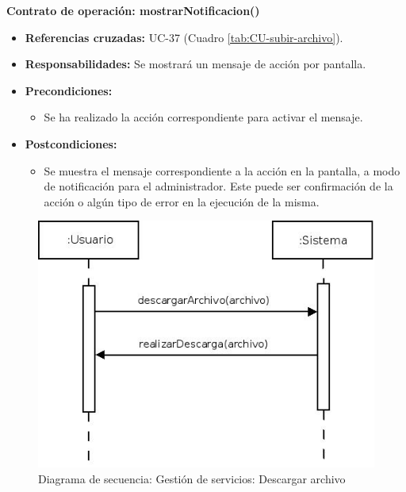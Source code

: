 \textbf{Contrato de operación: mostrarNotificacion()}
\begin{itemize}
\item \textbf{Referencias cruzadas:} UC-37 (Cuadro \ref{tab:CU-subir-archivo}).
\item \textbf{Responsabilidades:} Se mostrará un mensaje de acción por pantalla.
\item \textbf{Precondiciones:} 
 \begin{itemize}
\item Se ha realizado la acción correspondiente para activar el mensaje.
\end {itemize}
\item \textbf{Postcondiciones:} 
 \begin{itemize}
\item Se muestra el mensaje correspondiente a la acción en la pantalla, a modo de notificación para el administrador. Este puede ser confirmación de la acción o algún tipo de error en la ejecución de la misma.
\end {itemize}
\end {itemize}


\vspace{10mm}

\begin{figure}[H]
\centering
  \includegraphics[scale=.55]{img/secuencias/gestion-servicios-descargar-archivo.jpeg}
  \caption{Diagrama de secuencia: Gestión de servicios: Descargar archivo}
  \label{fig:secuencia-gestion-servicios-descargar-archivo}
\end{figure}

